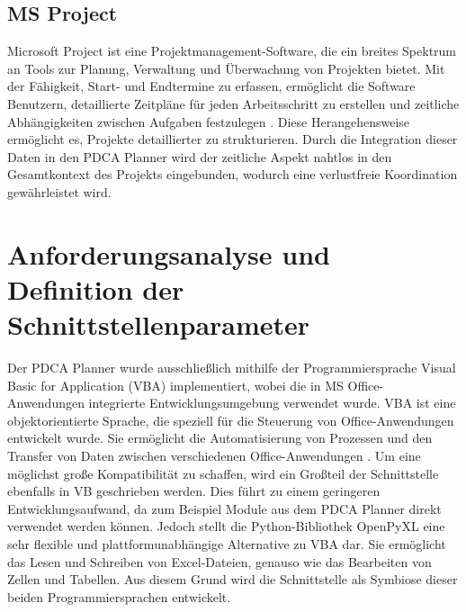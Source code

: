 \documentclass[11pt,a4paper]{report}
\begin{document}
\subsection{MS Project}
Microsoft Project ist eine Projektmanagement-Software, die ein breites Spektrum an Tools zur Planung, Verwaltung und Überwachung von Projekten bietet. Mit der Fähigkeit, Start- und Endtermine zu erfassen, ermöglicht die Software Benutzern, detaillierte Zeitpläne für jeden Arbeitsschritt zu erstellen und zeitliche Abhängigkeiten zwischen Aufgaben festzulegen \cite{MSProject}. Diese Herangehensweise ermöglicht es, Projekte detaillierter zu strukturieren. Durch die Integration dieser Daten in den PDCA Planner wird der zeitliche Aspekt nahtlos in den Gesamtkontext des Projekts eingebunden, wodurch eine verlustfreie Koordination gewährleistet wird.

\section{Anforderungsanalyse und Definition der Schnittstellenparameter}

Der PDCA Planner wurde ausschließlich mithilfe der Programmiersprache \glqq Visual Basic for Application \grqq{} (VBA) implementiert, wobei die in MS Office-Anwendungen integrierte  Entwicklungsumgebung verwendet wurde. VBA ist eine objektorientierte Sprache, die speziell für die Steuerung von Office-Anwendungen entwickelt wurde. Sie ermöglicht die Automatisierung von Prozessen und den Transfer von Daten zwischen verschiedenen Office-Anwendungen \cite{Kogan}. Um eine möglichst große Kompatibilität zu schaffen, wird ein Großteil der Schnittstelle ebenfalls in VB geschrieben werden. Dies führt zu  einem geringeren Entwicklungsaufwand, da zum Beispiel Module aus dem PDCA Planner direkt verwendet werden können. Jedoch stellt die Python-Bibliothek \glqq OpenPyXL \grqq{} eine sehr flexible und plattformunabhängige Alternative zu VBA dar. Sie ermöglicht das Lesen und Schreiben von Excel-Dateien, genauso wie das Bearbeiten von Zellen und Tabellen. Aus diesem Grund wird die Schnittstelle als Symbiose dieser beiden Programmiersprachen entwickelt.
\end{document}
